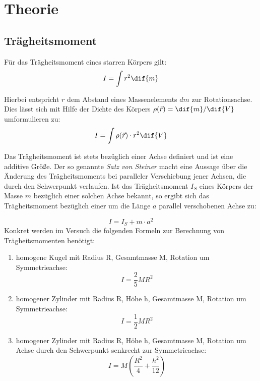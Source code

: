 \section{Theorie}

\subsection{Trägheitsmoment}
Für das Trägheitsmoment eines starren Körpers gilt:
\begin{equation}
   I = \int r^2 \dif{m}
\end{equation}

Hierbei entspricht $r$ dem Abstand eines Massenelements $dm$ zur Rotationsachse. Dies
lässt sich mit Hilfe der Dichte des Körpers $\rho(\vec{r}) = \dif{m}/\dif{V}$ umformulieren zu:
\begin{equation}
  I = \int \rho(\vec{r})\cdot r^2 \dif{V}
\end{equation}

Das Trägheitsmoment ist stets bezüglich einer Achse definiert und ist eine
additive Größe. Der so genannte \textit{Satz von Steiner} macht eine Aussage über die Änderung des Trägheitsmoments
bei paralleler Verschiebung jener Achsen, die durch den Schwerpunkt verlaufen. Ist das
Trägheitsmoment $I_S$ eines Körpers der Masse $m$ bezüglich einer solchen Achse bekannt, so ergibt sich das
Trägheitsmoment bezüglich einer um die Länge $a$ parallel verschobenen Achse zu:

\begin{equation}
    I = I_S + m \cdot a^2
    \label{eq: steiner}
\end{equation}
Konkret werden im Versuch die folgenden Formeln zur Berechnung von Trägheitsmomenten benötigt:
\begin{enumerate}
  \item homogene Kugel mit Radius R, Gesamtmasse M, Rotation um Symmetrieachse:
  \begin{equation}
  \label{eq:traeg_kugel}
    I = \frac{2}{5}M R^2
  \end{equation}

  \item homogener Zylinder mit Radius R, Höhe h, Gesamtmasse M, Rotation um Symmetrieachse:
  \begin{equation}
  \label{eq:traeg_zylinde}
    I = \frac{1}{2} M R^2
  \end{equation}

  \item homogener Zylinder mit Radius R, Höhe h, Gesamtmasse M, Rotation um Achse durch den Schwerpunkt senkrecht zur Symmetrieachse:
  \begin{equation}
  \label{eq:traeg_zylinder_schwer}
    I = M (\frac{R^2}{4} + \frac{h^2}{12})
  \end{equation}
\end{enumerate}

